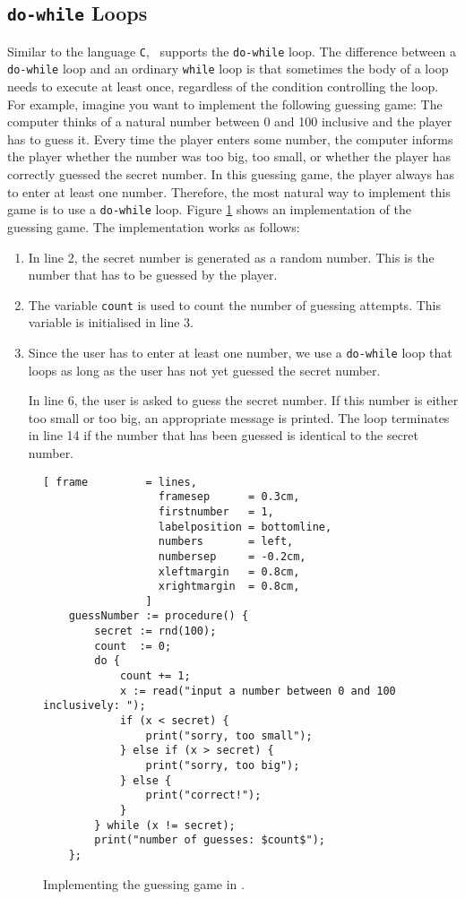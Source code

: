 \subsection{\texttt{do-while} Loops}
Similar to the language \texttt{C}, \setlx\ supports the \texttt{do-while} loop.  The difference
between a \texttt{do-while} loop and an ordinary \texttt{while} loop is that 
sometimes the body of a loop needs to execute at least once, regardless of the condition
controlling the loop.  For example, imagine you want to implement the following guessing game:  The computer
thinks of a natural number between 0 and 100 inclusive and the player has to guess it.  Every time the
player enters some number, the computer informs the player whether the number was too big, too
small, or whether the player has correctly guessed the secret number.  In this guessing game, the
player always has to enter at least one number.  Therefore, the most natural way to implement this
game is to use a \texttt{do-while} loop.  Figure \ref{fig:guessNumber.stlx} shows an implementation
of the guessing game.  The implementation works as follows:
\begin{enumerate}
\item In line 2, the secret number is generated as a random number.  This is the number that has to
      be guessed by the player.
\item The variable \texttt{count} is used to count the number of guessing attempts.
      This variable is initialised in line 3.
\item Since the user has to enter at least one number, we use a \texttt{do-while} loop that loops as
      long as the user has not yet guessed the secret number.

      In line 6, the user is asked to guess the secret number.  If this number is either too small
      or too big, an appropriate message is printed.  The loop terminates in line 14 if the number
      that has been guessed is identical to the secret number.
\end{enumerate}


\begin{figure}[!ht]
\centering
\begin{Verbatim}[ frame         = lines, 
                  framesep      = 0.3cm, 
                  firstnumber   = 1,
                  labelposition = bottomline,
                  numbers       = left,
                  numbersep     = -0.2cm,
                  xleftmargin   = 0.8cm,
                  xrightmargin  = 0.8cm,
                ]
    guessNumber := procedure() {
        secret := rnd(100);
        count  := 0;
        do {
            count += 1;
            x := read("input a number between 0 and 100 inclusively: ");
            if (x < secret) {
                print("sorry, too small");
            } else if (x > secret) {
                print("sorry, too big");
            } else {
                print("correct!");
            }
        } while (x != secret);
        print("number of guesses: $count$");
    };
\end{Verbatim}
\vspace*{-0.3cm}
\caption{Implementing the guessing game in \setlx.}
\label{fig:guessNumber.stlx}
\end{figure}

